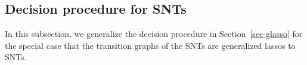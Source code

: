 
%
%
%
%

\subsection{Decision procedure for SNTs}\label{sec-gflat}

In this subsection, we generalize the decision procedure in Section~\ref{sec-glasso} for the special case that the transition graphs of the SNTs are generalized lassos to SNTs.

